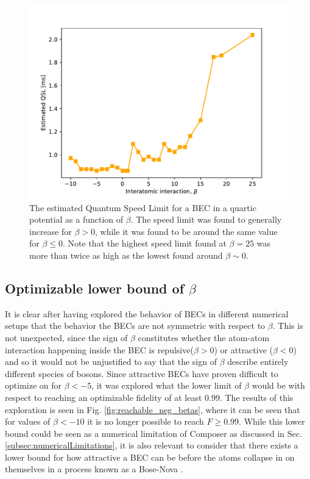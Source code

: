 \documentclass[a4paper, twocolumn]{revtex4-1}
\begin{document}
\begin{figure}[h]
	\includegraphics[width=\columnwidth]{graphics/exploration/QSL.pdf}
	\caption{The estimated Quantum Speed Limit for a BEC in a quartic potential as a function of $\beta$. The speed limit was found to generally increase for $\beta>0$, while it was found to be around the same value for $\beta\leq0$. Note that the highest speed limit found at $\beta=25$ was more than twice as high as the lowest found around $\beta \sim 0$.}
	\label{fig:QSL}
\end{figure}

\subsection{Optimizable lower bound of $\beta$}

It is clear after having explored the behavior of BECs in different numerical setups that the behavior the BECs are not symmetric with respect to $\beta$. This is not unexpected, since the sign of $\beta$ constitutes whether the atom-atom interaction happening inside the BEC is repulsive($\beta>0$) or attractive ($\beta<0$) and so it would not be unjustified to say that the sign of $\beta$ describe entirely different species of bosons. Since attractive BECs have proven difficult to optimize on for $\beta<-5$, it was explored what the lower limit of $\beta$ would be with respect to reaching an optimizable fidelity of at least $0.99$. The results of this exploration is seen in Fig. \ref{fig:reachable_neg_betas}, where it can be seen that for values of $\beta<-10$ it is no longer possible to reach $F\geq0.99$. While this lower bound could be seen as a numerical limitation of Composer as discussed in Sec. \ref{subsec:numericalLimitations}, it is also relevant to consider that there exists a lower bound for how attractive a BEC can be before the atoms collapse in on themselves in a process known as a Bose-Nova \cite{Donley2001}.
\end{document}
